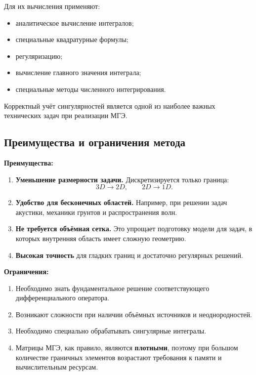 Для их вычисления применяют:
\begin{itemize}
	\item аналитическое вычисление интегралов;
	\item специальные квадратурные формулы;
	\item регуляризацию;
	\item вычисление главного значения интеграла;
	\item специальные методы численного интегрирования.
\end{itemize}

Корректный учёт сингулярностей является одной из наиболее важных технических задач при реализации МГЭ.

\subsection{Преимущества и ограничения метода}

\textbf{Преимущества:}
\begin{enumerate}
	\item \textbf{Уменьшение размерности задачи.} Дискретизируется только граница:
	$$
	3D\rightarrow2D,\qquad 2D\rightarrow1D.
	$$
	
	\item \textbf{Удобство для бесконечных областей.} Например, при решении задач акустики, механики грунтов и распространения волн.
	
	\item \textbf{Не требуется объёмная сетка.} Это упрощает подготовку модели для задач, в которых внутренняя область имеет сложную геометрию.
	
	\item \textbf{Высокая точность} для гладких границ и достаточно регулярных решений.
\end{enumerate}

\textbf{Ограничения:}
\begin{enumerate}
	\item Необходимо знать фундаментальное решение соответствующего дифференциального оператора.
	
	\item Возникают сложности при наличии объёмных источников и неоднородностей.
	
	\item Необходимо специально обрабатывать сингулярные интегралы.
	
	\item Матрицы МГЭ, как правило, являются \textbf{плотными}, поэтому при большом количестве граничных элементов возрастают требования к памяти и вычислительным ресурсам.
\end{enumerate}

